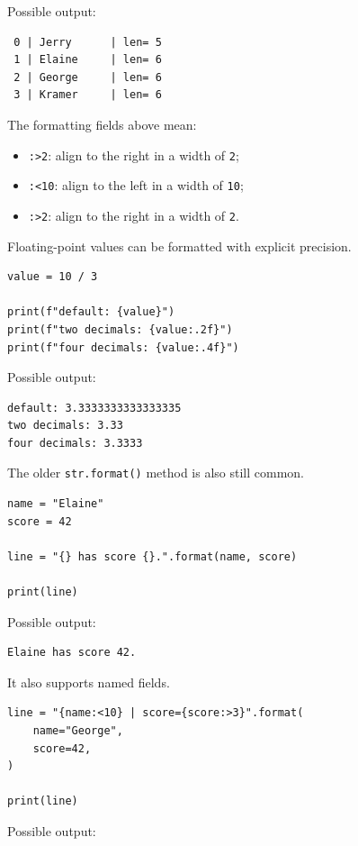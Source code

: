 Possible output:

\begin{verbatim}
 0 | Jerry      | len= 5
 1 | Elaine     | len= 6
 2 | George     | len= 6
 3 | Kramer     | len= 6
\end{verbatim}

The formatting fields above mean:

\begin{itemize}
    \item \texttt{:>2}: align to the right in a width of \texttt{2};
    \item \texttt{:<10}: align to the left in a width of \texttt{10};
    \item \texttt{:>2}: align to the right in a width of \texttt{2}.
\end{itemize}

Floating-point values can be formatted with explicit precision.

\begin{verbatim}
value = 10 / 3

print(f"default: {value}")
print(f"two decimals: {value:.2f}")
print(f"four decimals: {value:.4f}")
\end{verbatim}

Possible output:

\begin{verbatim}
default: 3.3333333333333335
two decimals: 3.33
four decimals: 3.3333
\end{verbatim}

The older \texttt{str.format()} method is also still common.

\begin{verbatim}
name = "Elaine"
score = 42

line = "{} has score {}.".format(name, score)

print(line)
\end{verbatim}

Possible output:

\begin{verbatim}
Elaine has score 42.
\end{verbatim}

It also supports named fields.

\begin{verbatim}
line = "{name:<10} | score={score:>3}".format(
    name="George",
    score=42,
)

print(line)
\end{verbatim}

Possible output:

